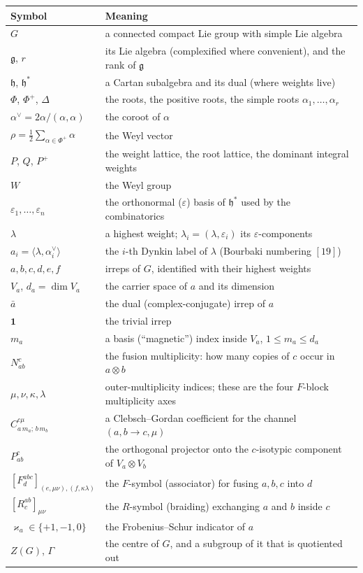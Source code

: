 \documentclass[11pt,a4paper]{article}
\theoremstyle{plain}
\theoremstyle{definition}
\newcommand{\g}{\mathfrak{g}}
\newcommand{\dual}[1]{\bar{#1}}
\begin{document}
\noindent
\begin{tabular}{@{}ll@{}}
\toprule
Symbol & Meaning \\
\midrule
$G$ & a connected compact Lie group with simple Lie algebra \\
$\g$, $r$ & its Lie algebra (complexified where convenient), and the rank of $\g$ \\
$\mathfrak{h}$, $\mathfrak{h}^*$ & a Cartan subalgebra and its dual (where weights live) \\
$\Phi$, $\Phi^+$, $\Delta$ & the roots, the positive roots, the simple roots $\alpha_1,\dots,\alpha_r$ \\
$\alpha^\vee = 2\alpha/(\alpha,\alpha)$ & the coroot of $\alpha$ \\
$\rho = \tfrac12\sum_{\alpha\in\Phi^+}\alpha$ & the Weyl vector \\
$P$, $Q$, $P^+$ & the weight lattice, the root lattice, the dominant integral weights \\
$W$ & the Weyl group \\
$\varepsilon_1,\dots,\varepsilon_n$ & the orthonormal ($\varepsilon$) basis of $\mathfrak{h}^*$ used by the combinatorics \\
$\lambda$ & a highest weight; $\lambda_i = (\lambda,\varepsilon_i)$ its $\varepsilon$-components \\
$a_i = \langle\lambda,\alpha_i^\vee\rangle$ & the $i$-th Dynkin label of $\lambda$ (Bourbaki numbering $[19]$) \\
$a,b,c,d,e,f$ & irreps of $G$, identified with their highest weights \\
$V_a$, $d_a=\dim V_a$ & the carrier space of $a$ and its dimension \\
$\dual a$ & the dual (complex-conjugate) irrep of $a$ \\
$\mathbf{1}$ & the trivial irrep \\
$m_a$ & a basis (``magnetic'') index inside $V_a$, $1\le m_a\le d_a$ \\
$N^c_{ab}$ & the fusion multiplicity: how many copies of $c$ occur in $a\otimes b$ \\
$\mu,\nu,\kappa,\lambda$ & outer-multiplicity indices; these are the four $F$-block multiplicity axes\footnotemark \\
$C^{c\mu}_{a\,m_a;\,b\,m_b}$ & a Clebsch--Gordan coefficient for the channel $(a,b\to c,\mu)$ \\
$P^c_{ab}$ & the orthogonal projector onto the $c$-isotypic component of $V_a\otimes V_b$ \\
$[F^{abc}_d]_{(e,\mu\nu),(f,\kappa\lambda)}$ & the $F$-symbol (associator) for fusing $a,b,c$ into $d$ \\
$[R^{ab}_c]_{\mu\nu}$ & the $R$-symbol (braiding) exchanging $a$ and $b$ inside $c$ \\
$\varkappa_a\in\{+1,-1,0\}$ & the Frobenius--Schur indicator of $a$ \\
$Z(G)$, $\Gamma$ & the centre of $G$, and a subgroup of it that is quotiented out \\
\bottomrule
\end{tabular}
\end{document}
